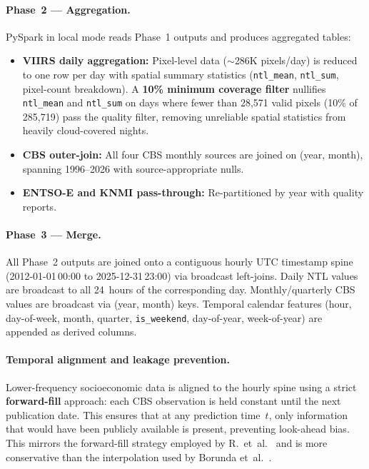 \paragraph{Phase~2 — Aggregation.}
PySpark in local mode reads Phase~1 outputs and produces aggregated tables:
\begin{itemize}
    \item \textbf{VIIRS daily aggregation:} Pixel-level data ($\sim$286K pixels/day) is reduced to one row per day with spatial summary statistics (\texttt{ntl\_mean}, \texttt{ntl\_sum}, pixel-count breakdown). A \textbf{10\% minimum coverage filter} nullifies \texttt{ntl\_mean} and \texttt{ntl\_sum} on days where fewer than 28{,}571 valid pixels (10\% of 285{,}719) pass the quality filter, removing unreliable spatial statistics from heavily cloud-covered nights.
    \item \textbf{CBS outer-join:} All four CBS monthly sources are joined on (year, month), spanning 1996--2026 with source-appropriate nulls.
    \item \textbf{ENTSO-E and KNMI pass-through:} Re-partitioned by year with quality reports.
\end{itemize}

\paragraph{Phase~3 — Merge.}
All Phase~2 outputs are joined onto a contiguous hourly UTC timestamp spine (2012-01-01\,00:00 to 2025-12-31\,23:00) via broadcast left-joins. Daily NTL values are broadcast to all 24~hours of the corresponding day. Monthly/quarterly CBS values are broadcast via (year, month) keys. Temporal calendar features (hour, day-of-week, month, quarter, \texttt{is\_weekend}, day-of-year, week-of-year) are appended as derived columns.

\paragraph{Temporal alignment and leakage prevention.}
Lower-frequency socioeconomic data is aligned to the hourly spine using a strict \textbf{forward-fill} approach: each CBS observation is held constant until the next publication date. This ensures that at any prediction time~$t$, only information that would have been publicly available is present, preventing look-ahead bias. This mirrors the forward-fill strategy employed by R.~et~al.~\cite{r_forecasting_2025} and is more conservative than the interpolation used by Borunda et~al.~\cite{borunda_machine_2025}.

